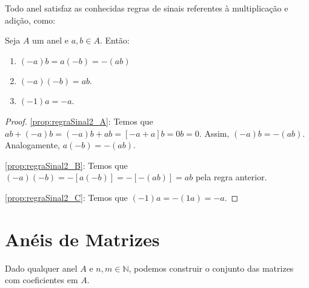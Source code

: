 Todo anel satisfaz as conhecidas regras de sinais referentes à multiplicação e adição, como:
\begin{prop}\label{prop:regraSinal2}
    Seja $A$ um anel e $a, b \in A$. Então:
    \begin{enumerate}[label=\alph*)]
        \item $(-a)b=a(-b)=-(ab)$\label{prop:regraSinal2_A}
        \item $(-a)(-b)=ab$.\label{prop:regraSinal2_B}
        \item $(-1)a=-a$.\label{prop:regraSinal2_C}
    \end{enumerate}
\end{prop}
\begin{proof}
    \ref{prop:regraSinal2_A}: Temos que $ab+(-a)b=(-a)b+ab=[-a+a]b=0b=0$. Assim, $(-a)b=-(ab)$. Analogamente, $a(-b)=-(ab)$.

    \ref{prop:regraSinal2_B}: Temos que $(-a)(-b)=-[a(-b)]=-[-(ab)]=ab$ pela regra anterior.

    \ref{prop:regraSinal2_C}: Temos que $(-1)a=-(1a)=-a$.
\end{proof}
\section{Anéis de Matrizes}
Dado qualquer anel $A$ e $n, m \in \mathbb N$, podemos construir o conjunto das matrizes com coeficientes em $A$.

